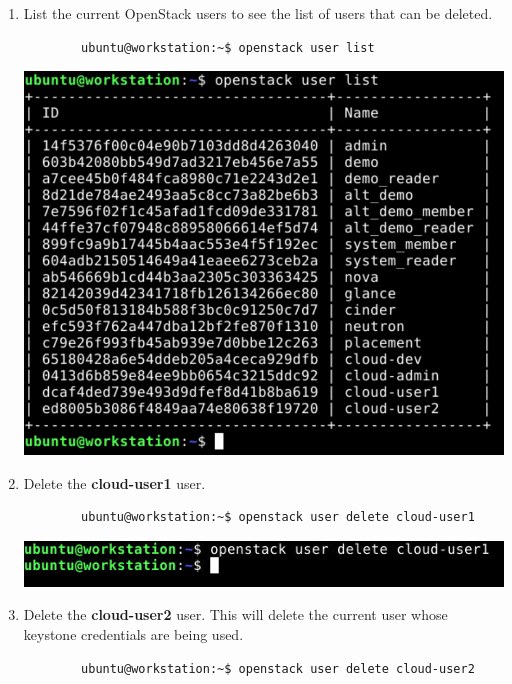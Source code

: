 \documentclass[letterpaper, 12pt]{article}
\begin{document}
\begin{enumerate}
    \item List the current OpenStack users to see the list of users that can be deleted.
    \begin{lstlisting}
        ubuntu@workstation:~$ openstack user list
    \end{lstlisting}

    \begin{center}
        \includegraphics[width=\linewidth]{images/part6/step8.png}
    \end{center}

    \item Delete the \textbf{cloud-user1} user.
    \begin{lstlisting}
        ubuntu@workstation:~$ openstack user delete cloud-user1
    \end{lstlisting}

    \begin{center}
        \includegraphics[width=\linewidth]{images/part6/step9.png}
    \end{center}

    \item Delete the \textbf{cloud-user2} user. This will delete the current user whose keystone credentials are being
    used.
    \begin{lstlisting}
        ubuntu@workstation:~$ openstack user delete cloud-user2
    \end{lstlisting}


\end{enumerate}
\end{document}
